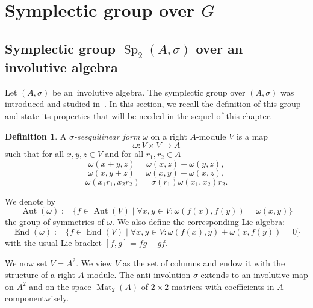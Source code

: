\documentclass[a4paper,oneside,11pt]{amsart}
\DeclareMathOperator{\Aut}{Aut}
\DeclareMathOperator{\Mat}{Mat}
\DeclareMathOperator{\Sp}{Sp}
\DeclareMathOperator{\End}{End}
\theoremstyle{plain}
\theoremstyle{definition}
\newtheorem{df}[teo]{Definition}
\theoremstyle{remark}
\newcommand{\defin}{\emph}
\begin{document}
\section{Symplectic group over \texorpdfstring{$G$}{G}}\label{Sp_2(G)}

\subsection{Symplectic group \texorpdfstring{$\Sp_2(A,\sigma)$}{Sp2(A,sigma)} over an involutive algebra}

Let $(A,\sigma)$ be an~involutive algebra. The symplectic group over $(A,\sigma)$ was introduced and studied in~\cite{ABRRW}. In this section, we recall the definition of this group and state its properties that will be needed in the sequel of this chapter.

\begin{df}\label{osp}
A \defin{$\sigma$-sesquilinear form} $\omega$ on a right $A$-module $V$ is a map
$$\omega\colon V\times V\to A$$
such that for all $x,y,z\in V$ and for all $r_1,r_2\in A$
$$\omega(x+y,z)=\omega(x,z)+\omega(y,z),$$
$$\omega(x,y+z)=\omega(x,y)+\omega(x,z),$$
$$\omega(x_1r_1,x_2r_2)=\sigma(r_1)\omega(x_1,x_2)r_2.$$

We denote by $$\Aut(\omega):=\{f\in\Aut(V)\mid \forall x,y\in V:\omega(f(x),f(y))=\omega(x,y)\}$$ the group of symmetries of $\omega$. We also define the corresponding Lie algebra:
$$\End(\omega):=\{f\in\End(V)\mid \forall x,y\in V:\omega(f(x),y)+\omega(x,f(y))=0\}$$
with the usual Lie bracket $[f,g]=fg-gf$.
\end{df}


We now set $V=A^2$. We view $V$ as the set of columns and endow it with the structure of a right $A$-module. The anti-involution $\sigma$ extends to an involutive map on $A^2$ and on the space $\Mat_2(A)$ of $2\times2$-matrices with coefficients in $A$ componentwisely.
\end{document}
